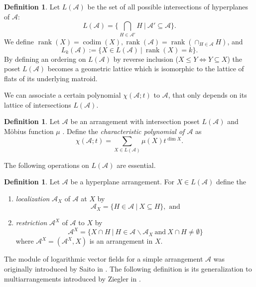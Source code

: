 \documentclass[12pt]{amsart}
\theoremstyle{definition}
\newtheorem{definition}[theorem]{Definition}
\theoremstyle{remark}
\newcommand{\rank}{\operatorname{rank}}
\newcommand{\codim}{\operatorname{codim}}
\newcommand\CA{{\mathscr A}}
\begin{document}
\begin{definition}
	Let $L(\CA)$ be the set of all possible intersections of hyperplanes of $\CA$: \[L(\CA) = \big\{ \textstyle\bigcap_{H\in \CA'}H~\vert ~\CA' \subseteq \CA\big\}.\]
	We define $\rank(X)=\codim(X), \rank(\CA)=\rank(\cap_{H\in \CA}H)$, and \[L_k(\CA) := \{X \in L(\CA)~\vert~\rank(X) = k\}. \] By defining an ordering on $L(\CA)$ by reverse inclusion ($X \leq  Y \Leftrightarrow Y \subseteq X$) the poset $L(\CA)$ becomes a geometric lattice \cite[Lem.~2.3]{MR1217488} which is isomorphic to the lattice of flats of its underlying matroid. 
\end{definition}

We can associate a certain polynomial $\chi(\CA;t)$ to $\CA$, that only depends on its lattice of intersections $L(\CA)$.

\begin{definition}
    Let $\CA$ be an arrangement with intersection poset $L(\CA)$ and Möbius function $\mu$ \cite[Def.~2.42]{MR1217488}. Define the \emph{characteristic polynomial of $\CA$} as $$\chi(\CA;t)=\sum_{X\in L(\CA)}\mu(X)t^{\dim X}.$$ 
\end{definition}

The following operations on $L(\CA)$ are essential.

\begin{definition}
    Let $\CA$ be a hyperplane arrangement. For $X\in L(\CA)$ define the
    \begin{enumerate}
        \item \emph{localization} $\CA_X$ of $\CA$ at $X$ by \[\CA_X = \{H \in \CA~\vert~X \subseteq H\},\text{ and}\]
        \item \emph{restriction} $\CA^X$ of $\CA$ to $X$ by \[\CA^X = \{X \cap H~\vert~H \in \CA\backslash\CA_X~\text{and}~X\cap H \not= \emptyset\}\]  where $\CA^X=(\CA^X, X)$ is an arrangement in $X$.
    \end{enumerate}
\end{definition}
 
 The module of logarithmic vector fields for a simple arrangement $\CA$ was originally introduced by Saito in \cite{MR0586450}. The following definition is its generalization to multiarrangements introduced by Ziegler in \cite{MR1000610}.
\end{document}
